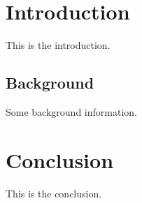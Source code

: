 \documentclass{article}
\begin{document}
\section{Introduction}
This is the introduction.

\subsection{Background}
Some background information.

\section{Conclusion}
This is the conclusion.
\end{document}
